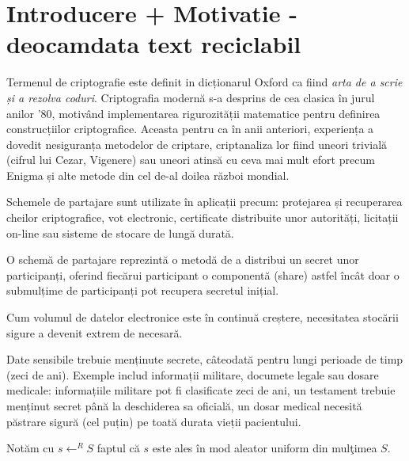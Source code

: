 \documentclass[oneside, 12pt]{book}
\newcommand{\todo}[1]{{\color{red}{TODO #1}}}
\begin{document}
\section{Introducere + Motivatie - deocamdata text reciclabil}
\label{sec:intro}

Termenul de criptografie este definit in dicționarul Oxford ca fiind \textit{arta de a scrie și a rezolva coduri}.
Criptografia modernă s-a desprins de cea clasica în jurul anilor '80, motivând implementarea rigurozității matematice pentru definirea construcțiilor criptografice. Aceasta pentru ca în anii anteriori, experiența a dovedit nesiguranța metodelor de criptare, criptanaliza lor fiind uneori trivială (cifrul lui Cezar, Vigenere) sau uneori atinsă cu ceva mai mult efort precum Enigma și alte metode din cel de-al doilea război mondial.

Schemele de partajare sunt utilizate în aplicații precum: protejarea și recuperarea cheilor criptografice, vot electronic, certificate distribuite unor autorități, licitații on-line sau sisteme de stocare de lungă durată. \cite{Martin:2008}

O schemă de partajare reprezintă o metodă de a distribui un secret unor participanți, oferind fiecărui participant o componentă (share) astfel încât doar o submulțime de participanți pot recupera secretul inițial.

Cum volumul de datelor electronice este în continuă creștere, necesitatea stocării sigure a devenit extrem de necesară.

Date sensibile trebuie menținute secrete, câteodată pentru lungi perioade de timp (zeci de ani). Exemple includ informații militare, documete legale sau dosare medicale: informațiile militare pot fi clasificate zeci de ani, un testament trebuie menținut secret până la deschiderea sa oficială, un dosar medical necesită păstrare sigură (cel puțin) pe toată durata vieții pacientului.

\todo{Notatii, PPT, uniform aleator, functie neglijabila}

Notăm cu $s \leftarrow^R S$ faptul că $s$ este ales în mod aleator uniform din mulţimea $S$. 
\end{document}

